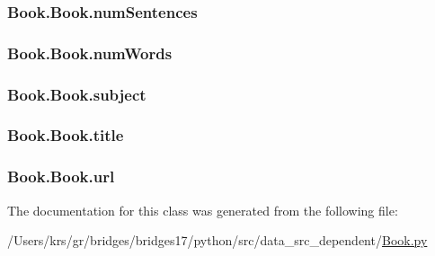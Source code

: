 \subsubsection[{num\+Sentences}]{\setlength{\rightskip}{0pt plus 5cm}Book.\+Book.\+num\+Sentences}\label{class_book_1_1_book_a750700b9cc757c9b23ab2c5030731543}
\hypertarget{class_book_1_1_book_accd8ca17020fbb9dc73b7a0b3d9348e2}{}
\subsubsection[{num\+Words}]{\setlength{\rightskip}{0pt plus 5cm}Book.\+Book.\+num\+Words}\label{class_book_1_1_book_accd8ca17020fbb9dc73b7a0b3d9348e2}
\hypertarget{class_book_1_1_book_a84be9f573910fda354e34de00fc95a61}{}
\subsubsection[{subject}]{\setlength{\rightskip}{0pt plus 5cm}Book.\+Book.\+subject}\label{class_book_1_1_book_a84be9f573910fda354e34de00fc95a61}
\hypertarget{class_book_1_1_book_aae1eab64f0e054709c003a270e86a202}{}
\subsubsection[{title}]{\setlength{\rightskip}{0pt plus 5cm}Book.\+Book.\+title}\label{class_book_1_1_book_aae1eab64f0e054709c003a270e86a202}
\hypertarget{class_book_1_1_book_a365ef43a762948ef862841d4d2f46420}{}
\subsubsection[{url}]{\setlength{\rightskip}{0pt plus 5cm}Book.\+Book.\+url}\label{class_book_1_1_book_a365ef43a762948ef862841d4d2f46420}


The documentation for this class was generated from the following file\+:\begin{DoxyCompactItemize}
\item 
/\+Users/krs/gr/bridges/bridges17/python/src/data\+\_\+src\+\_\+dependent/\hyperlink{_book_8py}{Book.\+py}\end{DoxyCompactItemize}

